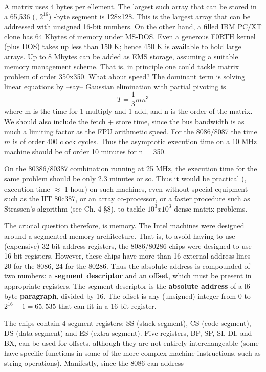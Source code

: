 A  matrix uses 4 bytes per ellement. The largest such array that can be stored in a 65,536 (\ie, $2^{16}$) -byte segment is 128x128. This is the largest array that can be addressed with unsigned 16-bit numbers. On the other hand, a filled IBM PC/XT clone has 64 Kbytes of memory under MS-DOS. Even a generous F0RTH kernel (plus DOS) takes up less than 150 K; hence 450 K is available to hold large arrays. Up to 8 Mbytes can be added as EMS storage, assuming a suitable memory management scheme. That is, in principle one could tackle matrix problem of order 350x350. What about speed? The dominant term is solving linear equations by --say-- Gaussian elimination with partial pivoting is
\[
T = \frac{1}{3} mn^{3}
\]
where m is the time for 1 multiply and 1 add, and n is the order of the matrix. We should also include the fetch + store time, since the bus bandwidth is as much a limiting factor as the FPU arithmetic speed. For the 8086/8087 the time $m$ is of order 400 clock cycles. Thus the asymptotic execution time on a 10 MHz machine should be of order 10 minutes for n = 350.

On the 80386/80387 combination running at 25 MHz, the execution time for the same problem should be only 2.3 minutes or so. Thus it would be practical (\ie, execution time $\approx$ 1 hour) on such machines, even without special equipment such as the IIT 80c387, or an array co-processor, or a faster procedure such as Strassen's algorithm (see Ch. 4 \S8), to tackle $10^{3} x 10^{3}$ dense matrix problems.

The crucial question therefore, is memory. The Intel machines were designed around a segmented memory architecture. That is, to avoid having to use (expensive) 32-bit address registers, the 8086/80286 chips were designed to use 16-bit registers. However, these chips have more than 16 external address lines - 20 for the 8086, 24 for the 80286. Thus the absolute address is compounded of two numbers: a \textbf{segment descriptor} and an \textbf{offset}, which must be present in appropriate registers. The segment descriptor is the \textbf{absolute address} of a l6-byte \textbf{paragraph}, divided by 16. The offset is any (unsigned) integer from 0 to $2^{16}-1 = 65,535$ that can fit in a 16-bit register.

The chips contain 4 segment registers: SS (stack segment), CS (code segment), DS (data segment) and ES (extra segment). Five registers, BP, SP, SI, DI, and BX, can be used for offsets, although they are not entirely interchangeable (some have specific functions in some of the more complex machine instructions, such as string operations). Manifestly, since the 8086 can address

